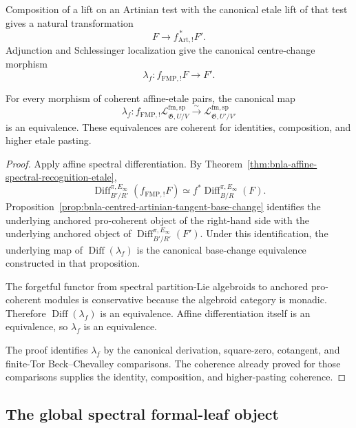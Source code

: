 Composition of a lift on an Artinian test with the canonical etale lift of
that test gives a natural transformation
\[
    F\longrightarrow f_{\mathrm{Art},!}^{\,*}F'.
\]
Adjunction and Schlessinger localization give the canonical centre-change
morphism
\[
\boxed{
    \lambda_f:
    f_{\mathrm{FMP},!}F
    \longrightarrow
    F'.}
\]

\begin{theorem}
\label{thm:bnla-formal-leaf-etale-cocartesian}
For every morphism of coherent affine-etale pairs, the canonical map
\[
\boxed{
    \lambda_f:
    f_{\mathrm{FMP},!}
    \mathcal L^{\mathrm{fm,sp}}_{\mathfrak G,U/V}
    \xrightarrow{\sim}
    \mathcal L^{\mathrm{fm,sp}}_{\mathfrak G,U'/V'}}
\]
is an equivalence.  These equivalences are coherent for identities,
composition, and higher etale pasting.
\end{theorem}

\begin{proof}
Apply affine spectral differentiation.  By
Theorem~\ref{thm:bnla-affine-spectral-recognition-etale},
\[
\operatorname{Diff}_{B'/R'}^{\pi,E_\infty}
\left(
    f_{\mathrm{FMP},!}F
\right)
\simeq
f^*
\operatorname{Diff}_{B/R}^{\pi,E_\infty}(F).
\]
Proposition~\ref{prop:bnla-centred-artinian-tangent-base-change} identifies
the underlying anchored pro-coherent object of the right-hand side with the
underlying anchored object of
$\operatorname{Diff}_{B'/R'}^{\pi,E_\infty}(F')$.  Under this
identification, the underlying map of
$\operatorname{Diff}(\lambda_f)$ is the canonical base-change equivalence
constructed in that proposition.

The forgetful functor from spectral partition-Lie algebroids to anchored
pro-coherent modules is conservative because the algebroid category is
monadic.  Therefore
$\operatorname{Diff}(\lambda_f)$ is an equivalence.  Affine differentiation
itself is an equivalence, so $\lambda_f$ is an equivalence.

The proof identifies $\lambda_f$ by the canonical derivation,
square-zero, cotangent, and finite-Tor Beck--Chevalley comparisons.  The
coherence already proved for those comparisons supplies the identity,
composition, and higher-pasting coherence.
\end{proof}

\subsection{The global spectral formal-leaf object}

